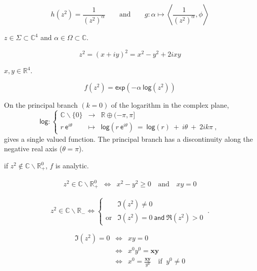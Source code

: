 \documentclass[10pt]{book}
\theoremstyle{break}
\begin{document}
\begin{equation*}
h(z^2) = \frac{1}{(z^2)^\alpha} \qquad \mbox{and} \qquad g : \alpha \mapsto \left\langle\frac{1}{(z^2)^\alpha},\phi\right\rangle
\end{equation*}

\noindent
$z \in \Sigma \subset \mathbb{C}^4$ and $\alpha \in \Omega \subset \mathbb{C}$. 

\begin{equation*}
z^2 = (x+iy)^2 = x^2 - y^2 + 2ixy
\end{equation*}

\noindent
$x, y \in \mathbb{R}^4$.

\begin{equation*}
f(z^2) = \mathsf{exp}\left(-\alpha \ \mathsf{log}(z^2) \right) 
\end{equation*}

\noindent
On the principal branch $(k=0)$ of the logarithm in the complex plane,
\begin{equation*}
\mathsf{log}: \left\{
\begin{array}{rcl}
\mathbb{C} \backslash \{0\}  & \to & \mathbb{R} \oplus (-\pi,\pi] \\
r \ \mathsf{e}^{i\theta} & \mapsto & \mathsf{log}(r \ \mathsf{e}^{i\theta}) \ = \ \mathsf{log}(r) \ + \ i\theta \ + \ 2 i k \pi \ , 
\end{array}\right.
\end{equation*}
gives a single valued function. The principal branch has a discontinuity along the negative real axis ($\theta=\pi$). 

\bigskip

\noindent
if $z^2 \notin \mathbb{C} \backslash \mathbb{R}^0_{+}$, $f$ is analytic.

\begin{eqnarray*}
z^2 \in \mathbb{C} \backslash \mathbb{R}^0_{+} &\Longleftrightarrow& x^2 - y^2 \geq 0 \quad \mbox{and} \quad xy=0
\end{eqnarray*}


\begin{equation*}
z^2 \in \mathbb{C} \backslash \mathbb{R}_{-} \Leftrightarrow 
\left\{
\begin{array}{cll}
& \Im(z^2) \neq 0 \\
\text{or} & \Im(z^2) = 0 \ \mathsf{and} \ \Re(z^2) > 0  
\end{array}
\right. \ .
\end{equation*}

\begin{eqnarray*}
\Im(z^2) = 0 &\Longleftrightarrow& xy=0 \\
&\Longleftrightarrow& x^0 y^0 = \mathbf{xy} \\
&\Longleftrightarrow& x^0 = \frac{\mathbf{xy}}{y^0} \quad \mbox{if } \ y^0 \neq 0
\end{eqnarray*}
\end{document}
